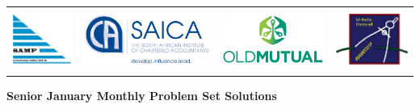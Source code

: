 \documentclass{article}
\begin{document}
\setlength{\tabcolsep}{6pt}
\begin{center} \begin{tabular}{cccc}
	\includegraphics[height=56pt]{SAMF_logo.jpg} &
	\includegraphics[height=56pt]{SAICA_logo.jpg} &
	\includegraphics[height=56pt]{OM_Logo_Stacked_Vignette_on_White_RGB.jpg} &
	\includegraphics[height=56pt]{SAMO2019.png}
\end{tabular} \end{center}


\bigskip


\begin{center}
	\textbf{\Large Senior January Monthly Problem Set Solutions}
\end{center}
\end{document}
